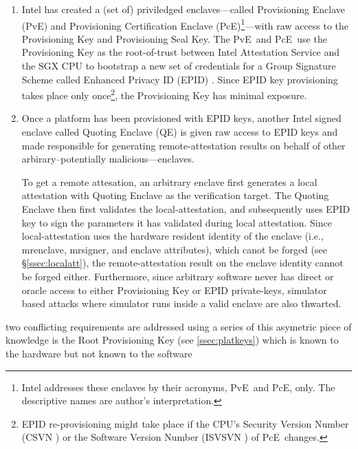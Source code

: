 \documentclass[10pt]{article}
\newcommand{\secref}[1]{\S\ref{#1}}
\newcommand{\mrenclave}{\textsf{mrenclave}}
\newcommand{\mrsigner}{\textsf{mrsigner}}
\newcommand{\pve}{\textsf{PvE}}
\newcommand{\pce}{\textsf{PcE}}
\newcommand{\qe}{\textsf{QE}}
\begin{document}
  \begin{enumerate}
    \item Intel has created a (set of) priviledged enclaves---called
      \textsf{Provisioning Enclave} (\pve) and \textsf{Provisioning
        Certification Enclave} (\pce)\footnote{Intel addresses these
        enclaves by their acronyms, \pve\ and \pce, only. The
        descriptive names are author's interpretation.}---with raw
      access to the Provisioning Key and Provisioning Seal Key. The
      \pve\ and \pce\ use the Provisioning Key as the root-of-trust
      between Intel Attestation Service and the SGX CPU to bootstrap a
      new set of credentials for a Group Signature Scheme
      \cite{ChaumGroupSignatures} called Enhanced Privacy ID (EPID)
      \cite{epid}. Since EPID key provisioning takes place only 
      once\footnote{EPID re-provisioning might take place if the CPU's
        Security Version Number (CSVN \cite[\S39.4.2.2]{intelsdm}) or
        the Software Version Number (ISVSVN
        \cite[\S39.4.2.1]{intelsdm}) of \pce\ changes.}, the
      Provisioning Key has minimal exposure. 

    \item Once a platform has been provisioned with EPID keys, another
      Intel signed enclave called \textsf{Quoting Enclave} (\qe) is
      given raw access to EPID keys and made responsible for
      generating remote-attestation results on behalf of other
      arbirary--potentially malicious---enclaves.

      To get a remote attesation, an arbitrary enclave first generates
      a local attestation with \textsf{Quoting Enclave} as the
      verification target. The \textsf{Quoting Enclave} then first
      validates the local-attestation, and subsequently uses EPID key
      to sign the parameters it has validated during local
      attestation. Since local-attestation uses the hardware resident
      identity of the enclave (i.e., \mrenclave, \mrsigner, and
      enclave attributes), which canot be forged (see
      \secref{ssec:localatt}), the remote-attestation result on the
      enclave identity cannot be forged either. Furthermore, since
      arbitrary software never has direct or oracle access to either
      Provisioning Key or EPID private-keys, simulator based attacks
      where simulator runs inside a valid enclave are also thwarted.
  \end{enumerate}

  two conflicting
  requirements are addressed using a series of this asymetric piece of
  knowledge is the Root Provisioning Key (see \ref{ssec:platkeys})
  which is known to the hardware but not known to the software
\end{document}
